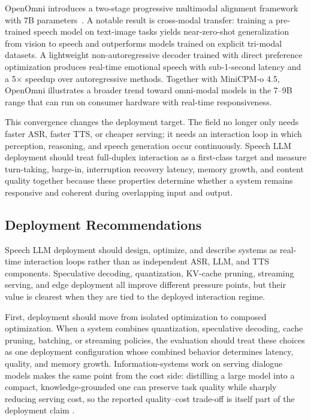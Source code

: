 OpenOmni introduces a two-stage progressive multimodal alignment framework with 7B parameters~\citep{luo2025openomniadvancingopensourceomnimodal}. A notable result is cross-modal transfer: training a pre-trained speech model on text-image tasks yields near-zero-shot generalization from vision to speech and outperforms models trained on explicit tri-modal datasets. A lightweight non-autoregressive decoder trained with direct preference optimization produces real-time emotional speech with sub-1-second latency and a 5$\times$ speedup over autoregressive methods. Together with MiniCPM-o 4.5, OpenOmni illustrates a broader trend toward omni-modal models in the 7--9B range that can run on consumer hardware with real-time responsiveness.

This convergence changes the deployment target. The field no longer only needs faster ASR, faster TTS, or cheaper serving; it needs an interaction loop in which perception, reasoning, and speech generation occur continuously. Speech LLM deployment should treat full-duplex interaction as a first-class target and measure turn-taking, barge-in, interruption recovery latency, memory growth, and content quality together because these properties determine whether a system remains responsive and coherent during overlapping input and output.

\subsection{Deployment Recommendations}

Speech LLM deployment should design, optimize, and describe systems as real-time interaction loops rather than as independent ASR, LLM, and TTS components. Speculative decoding, quantization, KV-cache pruning, streaming serving, and edge deployment all improve different pressure points, but their value is clearest when they are tied to the deployed interaction regime.

First, deployment should move from isolated optimization to composed optimization. When a system combines quantization, speculative decoding, cache pruning, batching, or streaming policies, the evaluation should treat these choices as one deployment configuration whose combined behavior determines latency, quality, and memory growth. Information-systems work on serving dialogue models makes the same point from the cost side: distilling a large model into a compact, knowledge-grounded one can preserve task quality while sharply reducing serving cost, so the reported quality--cost trade-off is itself part of the deployment claim \citep{hu2025roleplayer}.

